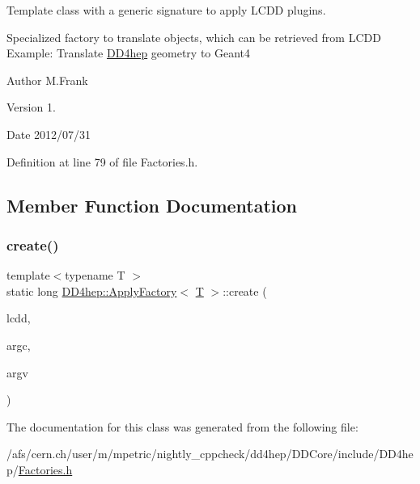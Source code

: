 Template class with a generic signature to apply L\+C\+DD plugins. 

Specialized factory to translate objects, which can be retrieved from L\+C\+DD Example\+: Translate \hyperlink{namespace_d_d4hep}{D\+D4hep} geometry to Geant4

\begin{DoxyAuthor}{Author}
M.\+Frank 
\end{DoxyAuthor}
\begin{DoxyVersion}{Version}
1. 
\end{DoxyVersion}
\begin{DoxyDate}{Date}
2012/07/31 
\end{DoxyDate}


Definition at line 79 of file Factories.\+h.



\subsection{Member Function Documentation}
\hypertarget{class_d_d4hep_1_1_apply_factory_abf2c5831e9f7ddafeb30d13373e0ce82}{}\label{class_d_d4hep_1_1_apply_factory_abf2c5831e9f7ddafeb30d13373e0ce82} 
\subsubsection{\texorpdfstring{create()}{create()}}
{\footnotesize\ttfamily template$<$typename T $>$ \\
static long \hyperlink{class_d_d4hep_1_1_apply_factory}{D\+D4hep\+::\+Apply\+Factory}$<$ \hyperlink{class_t}{T} $>$\+::create (\begin{DoxyParamCaption}\item[{\hyperlink{class_d_d4hep_1_1_geometry_1_1_l_c_d_d}{Geometry\+::\+L\+C\+DD} \&}]{lcdd,  }\item[{int}]{argc,  }\item[{char $\ast$$\ast$}]{argv }\end{DoxyParamCaption})\hspace{0.3cm}{\ttfamily [static]}}



The documentation for this class was generated from the following file\+:\begin{DoxyCompactItemize}
\item 
/afs/cern.\+ch/user/m/mpetric/nightly\+\_\+cppcheck/dd4hep/\+D\+D\+Core/include/\+D\+D4hep/\hyperlink{_d_d_core_2include_2_d_d4hep_2_factories_8h}{Factories.\+h}\end{DoxyCompactItemize}
